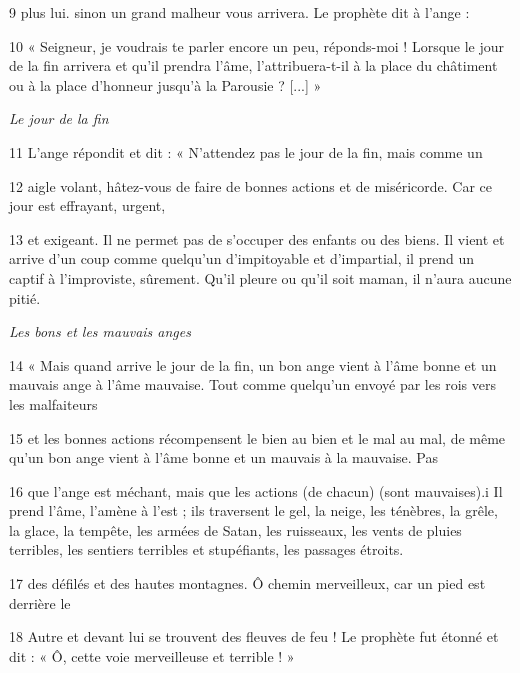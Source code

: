 \par 9 plus lui. sinon un grand malheur vous arrivera. Le prophète dit à l'ange :

\par 10 « Seigneur, je voudrais te parler encore un peu, réponds-moi ! Lorsque le jour de la fin arrivera et qu'il prendra l'âme, l'attribuera-t-il à la place du châtiment ou à la place d'honneur jusqu'à la Parousie ? [...] »

\par \textit{Le jour de la fin}

\par 11 L'ange répondit et dit : « N'attendez pas le jour de la fin, mais comme un

\par 12 aigle volant, hâtez-vous de faire de bonnes actions et de miséricorde. Car ce jour est effrayant, urgent,

\par 13 et exigeant. Il ne permet pas de s'occuper des enfants ou des biens. Il vient et arrive d'un coup comme quelqu'un d'impitoyable et d'impartial, il prend un captif à l'improviste, sûrement. Qu’il pleure ou qu’il soit maman, il n’aura aucune pitié.

\par \textit{Les bons et les mauvais anges}

\par 14 « Mais quand arrive le jour de la fin, un bon ange vient à l'âme bonne et un mauvais ange à l'âme mauvaise. Tout comme quelqu'un envoyé par les rois vers les malfaiteurs

\par 15 et les bonnes actions récompensent le bien au bien et le mal au mal, de même qu'un bon ange vient à l'âme bonne et un mauvais à la mauvaise. Pas

\par 16 que l'ange est méchant, mais que les actions (de chacun) (sont mauvaises).i Il prend l'âme, l'amène à l'est ; ils traversent le gel, la neige, les ténèbres, la grêle, la glace, la tempête, les armées de Satan, les ruisseaux, les vents de pluies terribles, les sentiers terribles et stupéfiants, les passages étroits.

\par 17 des défilés et des hautes montagnes. Ô chemin merveilleux, car un pied est derrière le

\par 18 Autre et devant lui se trouvent des fleuves de feu ! Le prophète fut étonné et dit : « Ô, cette voie merveilleuse et terrible ! »

